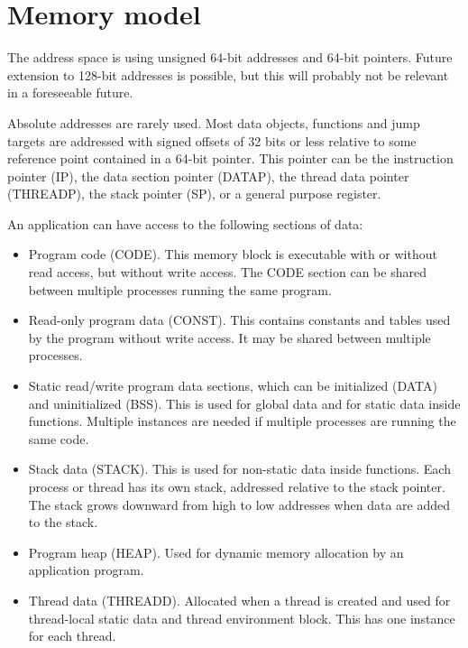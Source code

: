 \documentclass[forwardcom.tex]{subfiles}
\begin{document}
\RaggedRight

\chapter{Memory model} \label{memoryModel}
The address space is using unsigned 64-bit addresses and 64-bit pointers. Future extension to 128-bit addresses is possible, but this will probably not be relevant in a foreseeable future. 
\vspace{2mm}

Absolute addresses are rarely used. Most data objects, functions and jump targets are addressed with signed offsets of 32 bits or less relative to some reference point contained in a 64-bit pointer. This pointer can be the instruction pointer (IP), the data section pointer (DATAP), the thread data
pointer (THREADP), the stack pointer (SP), or a general purpose register.
\vspace{2mm}

An application can have access to the following sections of data:
\vspace{2mm}

\begin{itemize}
\item Program code (CODE). This memory block is executable with or without read access, but without write access. The CODE section can be shared between multiple processes running the same program. 

\item Read-only program data (CONST). This contains constants and tables used by the program without write access. It may be shared between multiple processes. 

\item Static read/write program data sections, which can be initialized (DATA) and uninitialized (BSS). This is used for global data and for static data inside functions. Multiple instances are needed if multiple processes are running the same code. 

\item Stack data (STACK). This is used for non-static data inside functions. Each process or thread has its own stack, addressed relative to the stack pointer. The stack grows downward from high to low addresses when data are added to the stack. 

\item Program heap (HEAP). Used for dynamic memory allocation by an application program. 

\item Thread data (THREADD). Allocated when a thread is created and used for thread-local static data and thread environment block. This has one instance for each thread.
\end{itemize}
\end{document}

